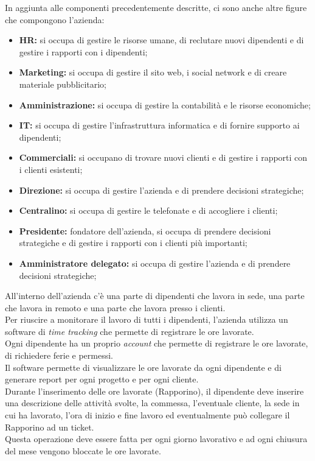 \noindent In aggiunta alle componenti precedentemente descritte, ci sono anche altre figure che compongono l'azienda:
\begin{itemize}
  \item \textbf{HR:} si occupa di gestire le risorse umane, di reclutare nuovi dipendenti e di gestire i rapporti con i dipendenti;
  \item \textbf{Marketing:} si occupa di gestire il sito web, i social network e di creare materiale pubblicitario;
  \item \textbf{Amministrazione:} si occupa di gestire la contabilità e le risorse economiche;
  \item \textbf{IT:} si occupa di gestire l'infrastruttura informatica e di fornire supporto ai dipendenti;
  \item \textbf{Commerciali:} si occupano di trovare nuovi clienti e di gestire i rapporti con i clienti esistenti;
  \item \textbf{Direzione:} si occupa di gestire l'azienda e di prendere decisioni strategiche;
  \item \textbf{Centralino:} si occupa di gestire le telefonate e di accogliere i clienti;
  \item \textbf{Presidente:} fondatore dell'azienda, si occupa di prendere decisioni strategiche e di gestire i rapporti con i clienti più importanti;
  \item \textbf{Amministratore delegato:} si occupa di gestire l'azienda e di prendere decisioni strategiche;
\end{itemize}

All'interno dell'azienda c'è una parte di dipendenti che lavora in sede, una parte che lavora in remoto e una parte che lavora presso i clienti. \\
Per riuscire a monitorare il lavoro di tutti i dipendenti, l'azienda utilizza un software di \textit{time tracking} che permette di registrare le ore lavorate. \\
Ogni dipendente ha un proprio \textit{account} che permette di registrare le ore lavorate, di richiedere ferie e permessi. \\
Il software permette di visualizzare le ore lavorate da ogni dipendente e di generare report per ogni progetto e per ogni cliente. \\
Durante l'inserimento delle ore lavorate (Rapporino), il dipendente deve inserire una descrizione delle attività svolte, la commessa, l'eventuale cliente,
la sede in cui ha lavorato, l'ora di inizio e fine lavoro ed eventualmente può collegare il Rapporino ad un ticket. \\
Questa operazione deve essere fatta per ogni giorno lavorativo e ad ogni chiusura del mese vengono bloccate le ore lavorate. \\

